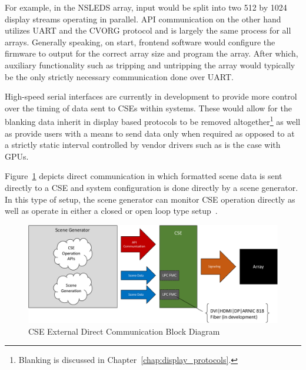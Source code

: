         For example, in the NSLEDS array, input would be split into two 512 by 1024 display streams operating in parallel. API communication on the other hand utilizes UART and the CVORG protocol and is largely the same process for all arrays. Generally speaking, on start, frontend software would configure the firmware to output for the correct array size and program the array. After which, auxiliary functionality such as tripping and untripping the array would typically be the only strictly necessary communication done over UART.

        High-speed serial interfaces are currently in development to provide more control over the timing of data sent to CSEs within systems. These would allow for the blanking data inherit in display based protocols to be removed altogether\footnote{Blanking is discussed in Chapter~\ref{chap:display_protocols}.} as well as provide users with a means to send data only when required as opposed to at a strictly static interval controlled by vendor drivers such as is the case with GPUs.

        Figure~\ref{fig:external_cse_comm_direct} depicts direct communication in which formatted scene data is sent directly to a CSE and system configuration is done directly by a scene generator. In this type of setup, the scene generator can monitor CSE operation directly as well as operate in either a closed or open loop type setup~\cite{NagrathGopal2009,Frank2018}.

        \begin{figure}
            \centering
            \includegraphics[width=1.0\textwidth]{fig/external_cse_comm_direct.pdf}
            \caption{CSE External Direct Communication Block Diagram}
            \label{fig:external_cse_comm_direct}
        \end{figure}

